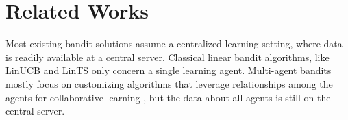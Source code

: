 \section{Related Works}
Most existing bandit solutions assume a centralized learning setting, where data is readily available at a central server. Classical linear bandit algorithms, like LinUCB \citep{li2010contextual,abbasi2011improved} and LinTS \citep{agrawal2013thompson,abeille2017linear} %
only concern a single learning agent.  
Multi-agent bandits mostly focus on customizing algorithms that leverage relationships among the agents for collaborative learning \citep{cesa2013gang,wang2019distributed,gentile2014online,cesa2013gang,wu2016contextual,li2021unifying}, but the data about all agents is still on the central server.

